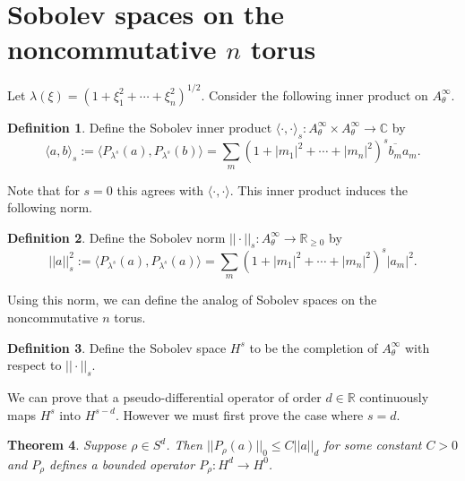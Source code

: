 \documentclass[10pt]{article}
\newtheorem{thm}{Theorem}[section]
\theoremstyle{remark}
\theoremstyle{definition}
\newtheorem{define}[thm]{Definition}
\begin{document}
\section{Sobolev spaces on the noncommutative $n$ torus}
Let $\lambda(\xi)=(1+\xi_1^2+\cdots+\xi_n^2)^{1/2}$.
Consider the following inner product on $A_{\theta}^{\infty}$.
\begin{define}
Define the Sobolev inner product
$\langle\cdot,\cdot\rangle_s:A_{\theta}^{\infty}\times
A_{\theta}^{\infty}\rightarrow\mathbb C$ by
$$\langle a,b\rangle_s:=
\langle P_{\lambda^s}(a),P_{\lambda^s}(b)\rangle
=\sum_m(1+|m_1|^2+\cdots+|m_n|^2)^s\overline{b_m}a_m.$$
\end{define}
Note that for $s=0$ this agrees with
$\langle\cdot,\cdot\rangle$.
This inner product induces the following norm.
\begin{define}
Define the Sobolev norm $||\cdot||_s:A_{\theta}^{\infty}\rightarrow\mathbb R_{\ge 0}$ by
$$||a||_s^2:=\langle P_{\lambda^s}(a),P_{\lambda^s}(a)\rangle
=\sum_m(1+|m_1|^2+\cdots+|m_n|^2)^s|a_m|^2.$$
\end{define}
Using this norm, we can define the analog of Sobolev spaces on the
noncommutative $n$ torus.
\begin{define}
Define the Sobolev space $H^s$ to be the completion of $A_{\theta}^{\infty}$
with respect to $||\cdot||_s$.
\end{define}
We can prove that a pseudo-differential operator of order $d\in\mathbb R$
continuously maps $H^s$ into $H^{s-d}$. However we must first prove the case
where $s=d$.
\begin{thm}\label{ws3}
Suppose $\rho\in S^d$. Then $||P_{\rho}(a)||_0\le C||a||_d$ for
some constant $C>0$ and $P_{\rho}$ defines a bounded operator
$P_{\rho}:H^d\rightarrow H^0$.
\end{thm}
\end{document}
